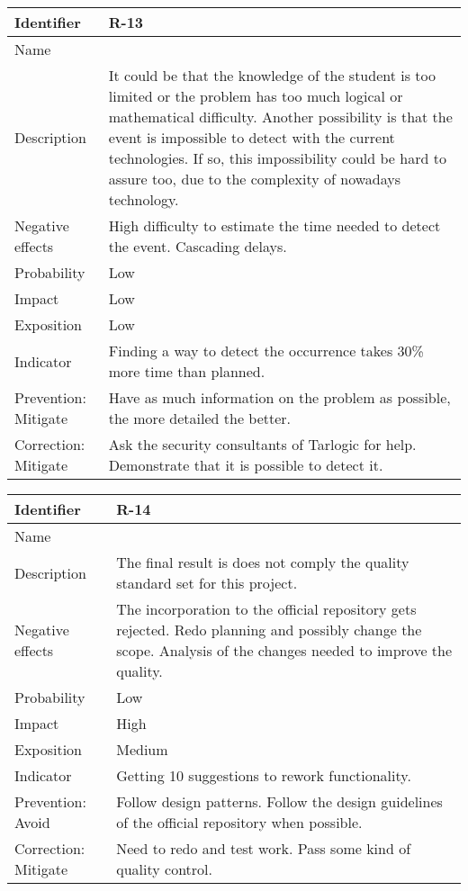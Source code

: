 \begin{table}[H]
	\begin{tabularx}{\textwidth}{|y|z|}
		\hline
		Identifier & \textbf{R-13} \\ \hline
		Name & \Rtrece \\ \hline
		Description &
			It could be that the knowledge of the student is too limited or the problem has too much logical or mathematical difficulty.\linej
			Another possibility is that the event is impossible to detect with the current technologies. If so, this impossibility could be hard to assure too, due to the complexity of nowadays technology.
		\\ \hline
		Negative effects &
			High difficulty to estimate the time needed to detect the event. \linej
			Cascading delays.
		\\ \hline
		Probability & Low\\ \hline
		Impact &  Low\\ \hline
		Exposition &  Low\\ \hline
		Indicator & Finding a way to detect the occurrence takes 30\% more time than planned.\\ \hline
		Prevention: Mitigate &
			Have as much information on the problem as possible, the more detailed the better.
		\\ \hline
		Correction: Mitigate &
			Ask the security consultants of Tarlogic for help. \linej
			Demonstrate that it is possible to detect it.
		\\ \hline
	\end{tabularx}
\end{table}

\begin{table}[H]
	\begin{tabularx}{\textwidth}{|y|z|}
		\hline
		Identifier & \textbf{R-14} \\ \hline
		Name & \Rcatorce \\ \hline
		Description &
			The final result is does not comply the quality standard set for this project.
		\\ \hline
		Negative effects &
			The incorporation to the official repository gets rejected.\linej
			Redo planning and possibly change the scope.  \linej
			Analysis of the changes needed to improve the quality.
		\\ \hline
		Probability & Low\\ \hline
		Impact &  High\\ \hline
		Exposition &  Medium\\ \hline
		Indicator & Getting 10 suggestions to rework functionality.\\ \hline
		Prevention: Avoid &
			Follow design patterns. \linej
			Follow the design guidelines of the official repository when possible.
		\\ \hline
		Correction: Mitigate &
			Need to redo and test work. \linej
			Pass some kind of quality control.
		\\ \hline
	\end{tabularx}
\end{table}

